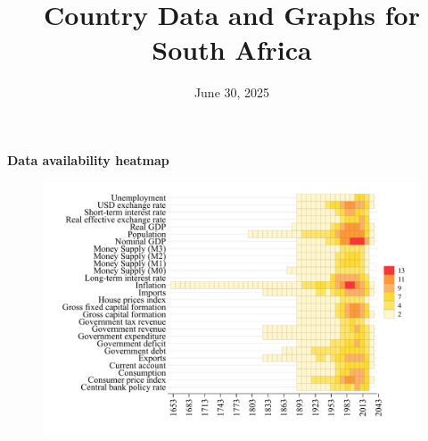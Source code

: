 \documentclass[12pt,a4paper,landscape]{article}
\begin{document}
\title{\Large Country Data and Graphs for South Africa}
\date{June 30, 2025}
\maketitle
\thispagestyle{empty}

\clearpage
\setcounter{page}{1}
\hypersetup{colorlinks=true,linkcolor=blue,linktoc=all}
\label{toc}
\tableofcontents
\thispagestyle{empty}
\clearpage
{}
{}
\begin{center}
{\Large\bfseries Data availability heatmap}
\end{center}
\vspace{1cm}
\begin{figure}[H]
\centering
\includegraphics[width=\textwidth,height=0.8\textheight,keepaspectratio]{graphs/ZAF_heatmap.pdf}
\end{figure}
\setcounter{page}{3}
\end{document}
